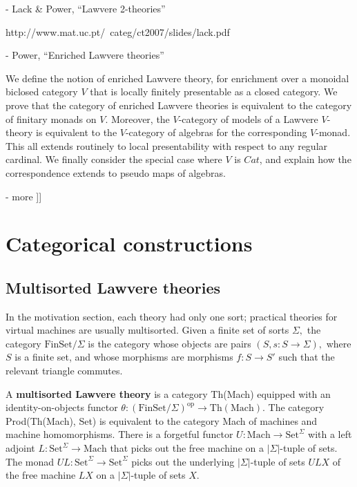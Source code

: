 \documentclass{article}
\newcommand{\maps}{\colon}
\newcommand{\FinSet}{\mathrm{FinSet}}
\newcommand{\Set}{\mathrm{Set}}
\newcommand{\Mach}{\mathrm{Mach}}
\newcommand{\op}{\mathrm{op}}
\begin{document}
- Lack \& Power, ``Lawvere 2-theories''

  http://www.mat.uc.pt/~categ/ct2007/slides/lack.pdf

- Power, ``Enriched Lawvere theories''

  We define the notion of enriched Lawvere theory, for enrichment over a monoidal biclosed category $V$ that is locally finitely presentable as a closed category. We prove that the category of enriched Lawvere theories is equivalent to the category of finitary monads on $V$. Moreover, the $V$-category of models of a Lawvere $V$-theory is equivalent to the $V$-category of algebras for the corresponding $V$-monad. This all extends routinely to local presentability with respect to any regular cardinal. We finally consider the special case where $V$ is $Cat$, and explain how the correspondence extends to pseudo maps of algebras.

- more
]]

\section{Categorical constructions}

\subsection{Multisorted Lawvere theories}
In the motivation section, each theory had only one sort; practical theories for virtual machines are usually multisorted.  Given a finite set of sorts $\Sigma,$ the category $\FinSet/\Sigma$ is the category whose objects are pairs $(S, s\maps S\to \Sigma),$ where $S$ is a finite set, and whose morphisms are morphisms $f\maps S \to S'$ such that the relevant triangle commutes.

A {\bf multisorted Lawvere theory} is a category Th(Mach) equipped with an identity-on-objects functor ${\theta\maps (\FinSet/\Sigma)^\op \to \mathrm{Th(Mach)}.}$  The category Prod(Th(Mach), Set) is equivalent to the category Mach of machines and machine homomorphisms.  There is a forgetful functor ${U\maps \Mach \to \Set^\Sigma}$ with a left adjoint ${L\maps \Set^\Sigma \to \Mach}$ that picks out the free machine on a $|\Sigma|$-tuple of sets.  The monad ${UL\maps \Set^\Sigma \to \Set^\Sigma}$ picks out the underlying $|\Sigma|$-tuple of sets $ULX$ of the free machine $LX$ on a $|\Sigma|$-tuple of sets $X$.
\end{document}
